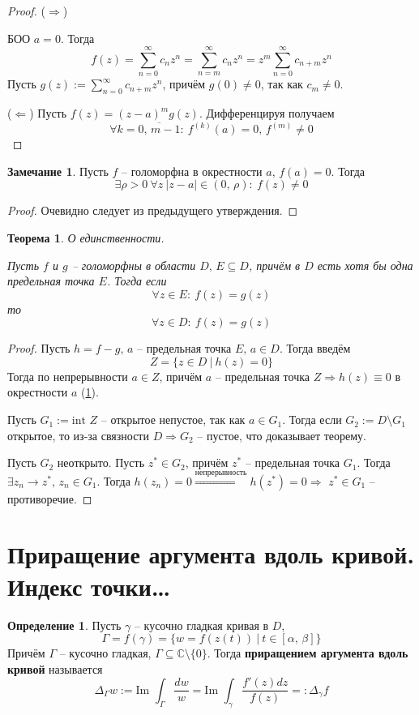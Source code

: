 \documentclass[a4paper,12pt]{article}
\theoremstyle{plain}
\newtheorem{theorem}{Теорема}[section]
\theoremstyle{definition}
\newtheorem{definition}{Определение}[section]
\newtheorem*{note}{Замечание}
\theoremstyle{remark}
\begin{document}
\begin{proof}
	($\Rightarrow$)

	БОО $a = 0$. Тогда
	\[
		f(z) = \sum_{n = 0}^\infty c_nz^n = \sum_{n = m}^\infty c_nz^n = z^m \sum_{n = 0}^\infty c_{n + m}z^n
	\]
	Пусть $g(z) :=\sum_{n = 0}^\infty c_{n + m}z^n$, причём $g(0) \neq 0$, так как $c_m \neq 0$.

	($\Leftarrow$) Пусть $f(z) = (z - a)^mg(z)$. Дифференцируя получаем
	\[
		\forall k = \overline{0,\,m-1} :\: f^{(k)}(a) = 0,\, f^{(m)} \neq 0
	\]
\end{proof}

\begin{note}\label{nonZero}
	Пусть $f$ -- голоморфна в окрестности $a,\, f(a) = 0$. Тогда
	\[
		\exists \rho > 0 \: \forall z \: \vert z - a\vert \in (0,\, \rho) :\: f(z) \neq 0
	\]
\end{note}

\begin{proof}
	Очевидно следует из предыдущего утверждения.
\end{proof}

\begin{theorem}
	О единственности.

	Пусть $f$ и $g$ -- голоморфны в области $D,\, E \subseteq D$, причём в $D$ есть хотя бы одна предельная точка $E$. Тогда если
	\[
		\forall z \in E :\: f(z) = g(z)
	\]
	то
	\[
		\forall z \in D :\: f(z) = g(z)
	\]
\end{theorem}

\begin{proof}
	Пусть $h = f - g,\, a $ -- предельная точка $E,\, a \in D$. Тогда введём
	\[
		Z = \{z \in D \:\vert\: h(z) = 0\}
	\]
	Тогда по непрерывности $a \in Z$, причём $a$ -- предельная точка $Z \Rightarrow h(z) \equiv 0$ в окрестности $a$ (\ref{nonZero}).

	Пусть $G_1 := \text{int }Z$ -- открытое непустое, так как $a \in G_1$. Тогда если $G_2 := D \setminus G_1$ открытое, то из-за связности $D \Rightarrow G_2$ -- пустое, что доказывает теорему.

	Пусть $G_2$ неоткрыто. Пусть $z^* \in G_2$, причём $z^*$ -- предельная точка $G_1$. Тогда $\exists z_n \to z^*,\, z_n \in G_1$. Тогда $h(z_n) = 0 \overset{\text{непрерывность}}{\Rightarrow} h(z^*) = 0 \Rightarrow$ $z^* \in G_1$ -- противоречие.
\end{proof}

\section{Приращение аргумента вдоль кривой. Индекс точки\dots}
\begin{definition}
	Пусть $\gamma$ -- кусочно гладкая кривая в $D$,
	\[
		\Gamma = f(\gamma) = \{w = f(z(t)) \:\vert\: t \in [\alpha,\, \beta]\}
	\]
	Причём $\Gamma$ -- кусочно гладкая, $\Gamma \subseteq \mathbb{C}\setminus\{0\}$. Тогда \textbf{приращением аргумента вдоль кривой} называется
	\[
		\Delta_\Gamma w := \text{Im }\int_\Gamma\frac{dw}{w} = \text{Im }\int_\gamma\frac{f'(z)dz}{f(z)} =: \Delta_\gamma f
	\]
\end{definition}
\end{document}
